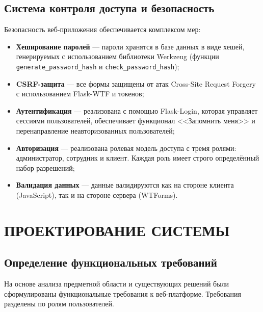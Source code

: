 \documentclass[14pt,a4paper,oneside]{extarticle}
\begin{document}
\subsection{Система контроля доступа и безопасность}

Безопасность веб-приложения обеспечивается комплексом мер:
\begin{itemize}[leftmargin=2cm]
    \item \textbf{Хеширование паролей} --- пароли хранятся в базе данных в виде хешей, генерируемых с использованием библиотеки Werkzeug (функции \texttt{generate\_password\_hash} и \texttt{check\_password\_hash});
    \item \textbf{CSRF-защита} --- все формы защищены от атак Cross-Site Request Forgery с использованием Flask-WTF и токенов;
    \item \textbf{Аутентификация} --- реализована с помощью Flask-Login, которая управляет сессиями пользователей, обеспечивает функционал <<Запомнить меня>> и перенаправление неавторизованных пользователей;
    \item \textbf{Авторизация} --- реализована ролевая модель доступа с тремя ролями: администратор, сотрудник и клиент. Каждая роль имеет строго определённый набор разрешений;
    \item \textbf{Валидация данных} --- данные валидируются как на стороне клиента (JavaScript), так и на стороне сервера (WTForms).
\end{itemize}


\newpage
\section{ПРОЕКТИРОВАНИЕ СИСТЕМЫ}

\subsection{Определение функциональных требований}

На основе анализа предметной области и существующих решений были сформулированы функциональные требования к веб-платформе. Требования разделены по ролям пользователей.
\end{document}
